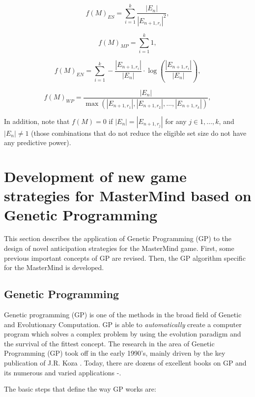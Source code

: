 \begin{equation}\label{ES}
f(M)_{ES}=\sum_{i=1}^k \frac{|E_n|}{|E_{n+1,r_i}|^2},
\end{equation}

\begin{equation}\label{MP}
f(M)_{MP}=\sum_{i=1}^k 1,
\end{equation}

\begin{equation}\label{EN}
f(M)_{EN}=\sum_{i=1}^k -\frac{|E_{n+1,r_i}|}{|E_n|} \cdot \log\left(\frac{|E_{n+1,r_i}|}{|E_n|}\right),
\end{equation}

\begin{equation}\label{WC}
f(M)_{WP}=\frac{|E_n|}{\max(|E_{n+1,r_1}|,|E_{n+1,r_2}|, \ldots, |E_{n+1,r_k}|)},
\end{equation}

In addition, note that $f(M)=0$ if $|E_n|=|E_{n+1,r_j}|$ for any $j \in {1, \ldots, k}$, and $|E_n| \neq 1$ (those combinations that do not reduce the eligible set size do not have any predictive power).


\section{Development of new game strategies for MasterMind based on Genetic Programming}\label{GP}

This section describes the application of Genetic Programming (GP) to the design of novel anticipation strategies for the MasterMind game.
First, some previous important concepts of GP are revised. Then, the GP algorithm specific for the MasterMind is developed.

\subsection{Genetic Programming}

Genetic programming (GP) is one of the methods in the broad field of Genetic and Evolutionary Computation. GP is able to \emph{automatically} create a computer program which solves a complex problem by using the evolution paradigm and the survival of the fittest concept. The research in the area of Genetic Programming (GP) took off in the early 1990's, mainly driven by the key publication of J.R. Koza \cite{Koza92a}. Today, there are dozens of excellent books on GP and its numerous and varied applications \cite{Koza92b}-\cite{Angeline96}.

The basic steps that define the way GP works are:

